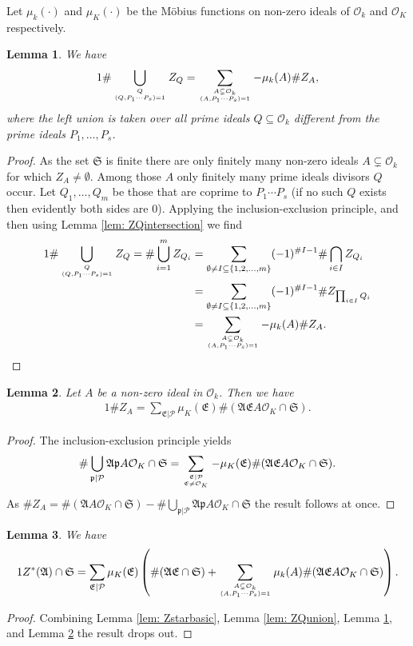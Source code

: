 \documentclass[11pt]{amsart}
\newtheorem{lemma}{Lemma}[section]
\numberwithin{equation}{eqncounter}
\def\Pc{\mathcal{P}}
\def\p{\mathfrak{p}}
\def\A{\mathfrak{A}}
\def\E{\mathfrak{E}}
\def\Zstar{Z^*}
\def\Z{Z}
\def\Sa{\mathfrak{S}}
\def\Oseen{{\mathcal{O}}}
\begin{document}
Let $\mu_k(\cdot)$ and $\mu_K(\cdot)$ be the M\"obius functions on non-zero  ideals of $\Oseen_k$ and  $\Oseen_K$ respectively.
\begin{lemma}\label{lem: countZQunion}
We have 
\begin{alignat*}1
\#\bigcup_{Q \atop (Q,P_1\cdots P_s)=1}\Z_{Q}=\sum_{A\subsetneq \Oseen_k \atop (A,P_1\cdots P_s)=1}-\mu_k(A)\#\Z_A,
\end{alignat*}
where the left union is taken over all prime ideals $Q\subseteq \Oseen_k$ different from the prime ideals $P_1,\ldots,P_s$. 
\end{lemma}
\begin{proof}
As the set $\Sa$ is finite there are only finitely many non-zero ideals $A\subsetneq \Oseen_k$   for which $\Z_{A}\neq \emptyset$.
Among those $A$ only finitely many prime ideals divisors $Q$ occur. 
Let $Q_1,\ldots,Q_m$ be those
that are coprime to $P_1\cdots P_s$ (if no such $Q$ exists then evidently both sides are $0$).
Applying the inclusion-exclusion principle, and then using Lemma \ref{lem: ZQintersection} we find
\begin{alignat*}1
\#\bigcup_{Q \atop (Q,P_1\cdots P_s)=1}\Z_{Q}=\#\bigcup_{i=1}^m\Z_{Q_i}&=\sum_{\emptyset\neq I\subseteq \{1,2,\ldots,m\}}(-1)^{\#I-1}\#\bigcap_{i\in I}\Z_{Q_i}\\
&=\sum_{\emptyset\neq I\subseteq \{1,2,\ldots,m\}}(-1)^{\#I-1}\#\Z_{\prod_{i\in I}Q_i}\\
&=\sum_{A\subsetneq \Oseen_k \atop (A,P_1\cdots P_s)=1}-\mu_k(A)\#\Z_A.
\end{alignat*}
\end{proof}

\begin{lemma}\label{lem: countZA}
Let $A$ be a non-zero ideal in $\Oseen_k$. Then we have 
\begin{alignat*}1
\#\Z_{A}=\sum_{\E|\Pc}\mu_K(\E)\#(\A\E A\Oseen_K\cap \Sa).
\end{alignat*}
\end{lemma}
\begin{proof}
The inclusion-exclusion principle yields
$$\#\bigcup_{\p|\Pc}\A\p A\Oseen_K\cap \Sa=\sum_{\E|\Pc \atop \E\neq \Oseen_K}-\mu_K(\E)\#(\A\E A\Oseen_K\cap \Sa).$$
As $\#\Z_{A}=\#(\A A\Oseen_K\cap \Sa)-\#\bigcup_{\p|\Pc}\A\p A\Oseen_K\cap \Sa$ the result follows at once.
\end{proof}


\begin{lemma}\label{lem: Zstarcount}
We have 
\begin{alignat*}1
\Zstar(\A)\cap \Sa=\sum_{\E|\Pc}\mu_K(\E)\left(\#(\A\E\cap \Sa)
+\sum_{A\subsetneq \Oseen_k \atop (A,P_1\cdots P_s)=1}\mu_k(A)\#(\A\E A\Oseen_K\cap \Sa)\right).
\end{alignat*}
\end{lemma}
\begin{proof}
Combining Lemma \ref{lem: Zstarbasic}, Lemma \ref{lem: ZQunion}, Lemma \ref{lem: countZQunion}, and Lemma \ref{lem: countZA}
the result drops out.
\end{proof}
\end{document}
